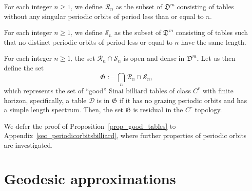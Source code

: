 \documentclass[reqno,11pt]{amsart}
\begin{document}
\begin{defi}
For each integer $n\geq 1$, we define \( \mathcal{R}_n \) as the subset of \( \mathfrak{D}^m \) consisting of tables without any singular periodic orbits of period less than or equal to \( n \).
\end{defi}

\begin{defi}
For each integer $n\geq 1$, we define \( \mathcal{S}_n \) as the subset of \( \mathfrak{D}^m \) consisting of tables such that no distinct periodic orbits of period less or equal to \( n \) have the same length.
\end{defi}

\begin{prop}\label{prop_good_tables}
For each integer $n \geq 1$, the set \( \mathcal{R}_n \cap \mathcal{S}_n \)  is open and dense in $\mathfrak{D}^m$. 
    Let us then define the set 
    \begin{equation*}
        \mathfrak{G} := \bigcap_n \mathcal{R}_n \cap \mathcal{S}_n,
    \end{equation*}
   which represents the set of ``good'' Sinai billiard tables of class $C^r$ with finite horizon, specifically, a table $\mathcal{D}$ is in $\mathfrak{G}$ if it has no grazing periodic orbits and has a simple length spectrum. Then, the set $\mathfrak{G}$ is residual in the $C^r$ topology. 
\end{prop}
We defer the proof of Proposition~\ref{prop_good_tables} to Appendix~\ref{sec_periodicorbitsbilliard}, where  further properties of periodic orbits are investigated. 


\section{Geodesic approximations}\label{sec:geodesic_approximations}
\end{document}
